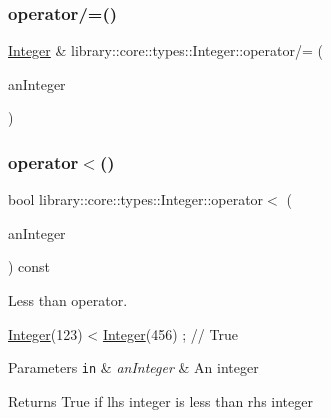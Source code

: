 \subsubsection{\texorpdfstring{operator/=()}{operator/=()}\hspace{0.1cm}{\footnotesize\ttfamily [2/2]}}
{\footnotesize\ttfamily \hyperlink{classlibrary_1_1core_1_1types_1_1_integer}{Integer} \& library\+::core\+::types\+::\+Integer\+::operator/= (\begin{DoxyParamCaption}\item[{const \hyperlink{classlibrary_1_1core_1_1types_1_1_integer_a623afb1580f870fd8a1997b1c12c917d}{Integer\+::\+Value\+Type} \&}]{an\+Integer }\end{DoxyParamCaption})}

\mbox{\label{classlibrary_1_1core_1_1types_1_1_integer_a7f179765edbdeb186cde5e869021ccb6}} 
\subsubsection{\texorpdfstring{operator$<$()}{operator<()}\hspace{0.1cm}{\footnotesize\ttfamily [1/2]}}
{\footnotesize\ttfamily bool library\+::core\+::types\+::\+Integer\+::operator$<$ (\begin{DoxyParamCaption}\item[{const \hyperlink{classlibrary_1_1core_1_1types_1_1_integer}{Integer} \&}]{an\+Integer }\end{DoxyParamCaption}) const}



Less than operator. 


\begin{DoxyCode}
\hyperlink{classlibrary_1_1core_1_1types_1_1_integer_a6483b1c4e13e5ed6af5e7a58347efead}{Integer}(123) < \hyperlink{classlibrary_1_1core_1_1types_1_1_integer_a6483b1c4e13e5ed6af5e7a58347efead}{Integer}(456) ; \textcolor{comment}{// True}
\end{DoxyCode}



\begin{DoxyParams}[1]{Parameters}
\mbox{\tt in}  & {\em an\+Integer} & An integer \\
\hline
\end{DoxyParams}
\begin{DoxyReturn}{Returns}
True if lhs integer is less than rhs integer 
\end{DoxyReturn}
\mbox{\label{classlibrary_1_1core_1_1types_1_1_integer_ad893d193755f414dd680fd867ff30ea0}} 
